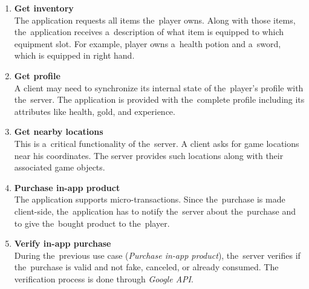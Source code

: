 	\begin{enumerate}
		\item \textbf{Get inventory}\\
		The application requests all items the~player owns. Along with those items, the~application receives a~description of what item is equipped to which equipment slot. For example, player owns a~health potion and a~sword, which is equipped in right hand.
		
		\item \textbf{Get profile}\\
		A client may need to synchronize its internal state of the~player's profile with the~server. The application is provided with the~complete profile including its attributes like health, gold, and experience.
		
		
		\item \textbf{Get nearby locations}\\
		This is a~critical functionality of the~server. A client asks for game locations near his coordinates. The server provides such locations along with their associated game objects.
		
		
		\item \textbf{Purchase in-app product}\\
		The application supports micro-transactions. Since the~purchase is made client-side, the~application has to notify the~server about the~purchase and to give the~bought product to the~player. 
		
		
		\item \textbf{Verify in-app purchase}\\
		During the~previous use case (\textit{Purchase in-app product}), the~server verifies if the~purchase is valid and not fake, canceled, or already consumed. The verification process is done through \textit{Google API}.
		
		
	\end{enumerate}
	

